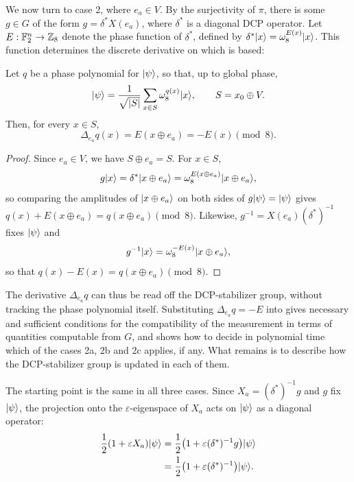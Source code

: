 We now turn to case 2, where $e_a \in V$. By the surjectivity of $\pi$, there is some $g \in G$ of the form $g = \delta^* X(e_a)$, where $\delta^*$ is a diagonal DCP operator. Let $E : \mathbb{F}_2^n \to \mathbb{Z}_8$ denote the phase function of $\delta^*$, defined by $\delta^* |x\rangle = \omega_8^{E(x)} |x\rangle$. This function determines the discrete derivative on which  is based:

\begin{proposition}\label{prop:derivative-from-E}
    Let $q$ be a phase polynomial for $|\psi\rangle$, so that, up to global phase,
    \[
        |\psi\rangle = \frac{1}{\sqrt{|S|}} \sum_{x \in S} \omega_8^{q(x)} |x\rangle,
        \qquad S = x_0 \oplus V.
    \]
    Then, for every $x \in S$,
    \[
        \Delta_{e_a} q(x) = E(x \oplus e_a) = -E(x) \pmod 8.
    \]
\end{proposition}
\begin{proof}
    Since $e_a \in V$, we have $S \oplus e_a = S$. For $x \in S$,
    \[
        g|x\rangle = \delta^*|x \oplus e_a\rangle = \omega_8^{E(x \oplus e_a)}|x \oplus e_a\rangle,
    \]
    so comparing the amplitudes of $|x \oplus e_a\rangle$ on both sides of $g|\psi\rangle = |\psi\rangle$ gives
    $q(x) + E(x \oplus e_a) = q(x \oplus e_a) \pmod 8$. Likewise, $g^{-1} = X(e_a)(\delta^*)^{-1}$ fixes $|\psi\rangle$ and
    \[
        g^{-1}|x\rangle = \omega_8^{-E(x)}|x \oplus e_a\rangle,
    \]
    so that $q(x) - E(x) = q(x \oplus e_a) \pmod 8$.
\end{proof}

The derivative $\Delta_{e_a} q$ can thus be read off the DCP-stabilizer group, without tracking the phase polynomial itself. Substituting $\Delta_{e_a} q = -E$ into  gives necessary and sufficient conditions for the compatibility of the measurement in terms of quantities computable from $G$, and  shows how to decide in polynomial time which of the cases 2a, 2b and 2c applies, if any. What remains is to describe how the DCP-stabilizer group is updated in each of them.

The starting point is the same in all three cases. Since $X_a = (\delta^*)^{-1} g$ and $g$ fix $|\psi\rangle$, the projection onto the $\varepsilon$-eigenspace of $X_a$ acts on $|\psi\rangle$ as a diagonal operator:
\begin{align}
    \frac{1}{2}(1 + \varepsilon X_a) \ket{\psi}
    &= \frac{1}{2}\big(1 + \varepsilon (\delta^*)^{-1} g\big) \ket{\psi} \notag \\
    &= \frac{1}{2}\big(1 + \varepsilon (\delta^*)^{-1}\big) \ket{\psi}.
    \label{eq:x-projection-diagonal}
\end{align}

